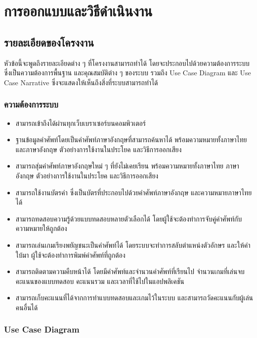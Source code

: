 \documentclass[12pt,oneside,openright,a4paper]{cpe-thai-project}
\begin{document}

\chapter{การออกแบบและวิธีดำเนินงาน}

\section{รายละเอียดของโครงงาน}
\hspace{1cm}
หัวข้อนี้จะพูดถึงรายละเอียดต่าง ๆ ที่โครงงานสามารถทำได้ โดยจะประกอบไปด้วยความต้องการระบบ
ซึ่งเป็นความต้องการพื้นฐาน และคุณสมบัติต่าง ๆ ของระบบ รวมถึง Use Case Diagram
และ Use Case Narrative ซึ่งจะแสดงให้เห็นถึงสิ่งที่ระบบสามารถทำได้

\subsection{ความต้องการระบบ}
\begin{itemize}
	\item สามารถเข้าถึงได้ผ่านทุกเว็บเบราเซอร์บนคอมพิวเตอร์
	\item ฐานข้อมูลคำศัพท์โดยเป็นคำศัพท์ภาษาอังกฤษที่สามารถค้นหาได้ พร้อมความหมายทั้งภาษาไทยและภาษาอังกฤษ ตัวอย่างการใช้งานในประโยค และวิธีการออกเสียง
	\item สามารถสุ่มคำศัพท์ภาษาอังกฤษใหม่ ๆ ที่ยังไม่เคยเรียน พร้อมความหมายทั้งภาษาไทย ภาษาอังกฤษ ตัวอย่างการใช้งานในประโยค และวิธีการออกเสียง
	\item สามารถใช้งานบัตรคำ ซึ่งเป็นบัตรที่ประกอบไปด้วยคำศัพท์ภาษาอังกฤษ และความหมายภาษาไทยได้
	\item สามารถทดสอบความรู้ด้วยแบบทดสอบหลายตัวเลือกได้ โดยผู้ใช้จะต้องทำการจับคู่คำศัพท์กับความหมายให้ถูกต้อง
	\item สามารถเล่นเกมเรียงพยัญชนะเป็นคำศัพท์ได้ โดยระบบจะทำการสลับตำแหน่งตัวอักษร และให้คำใบ้มา ผู้ใช้จะต้องทำการพิมพ์คำศัพท์ที่ถูกต้อง
	\item สามารถติดตามความคืบหน้าได้ โดยมีคำศัพท์และจำนวนคำศัพท์ที่เรียนไป จำนวนเกมที่เล่นจบ คะแนนของแบบทดสอบ คะแนนรวม และเวลาที่ใช้ไปในแอปพลิเคชัน
	\item สามารถเก็บคะแนนที่ได้จากการทำแบบทดสอบและเกมไว้ในระบบ และสามารถวัดคะแนนกับผู้เล่นคนอื่นได้
\end{itemize}

\pagebreak
\subsection{Use Case Diagram}
\end{document}
